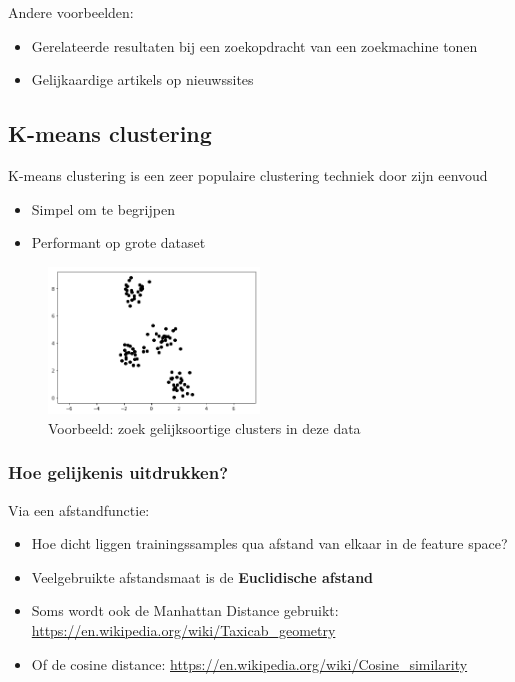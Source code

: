 \documentclass{article}
\begin{document}
Andere voorbeelden:

\begin{itemize}
    \item Gerelateerde resultaten bij een zoekopdracht van een zoekmachine tonen
    \item Gelijkaardige artikels op nieuwssites
\end{itemize}

\subsection{K-means clustering}

K-means clustering is een zeer populaire clustering techniek door zijn eenvoud

\begin{itemize}
    \item Simpel om te begrijpen
    \item Performant op grote dataset
\end{itemize}

\begin{figure}[H]
    \centering
    \includegraphics[width=0.5\textwidth]{k-means-1.png}
    \caption{Voorbeeld: zoek gelijksoortige clusters in deze data}
\end{figure}

\subsubsection{Hoe gelijkenis uitdrukken?}

Via een afstandfunctie:

\begin{itemize}
    \item Hoe dicht liggen trainingssamples qua afstand van elkaar in de feature space?
    \item Veelgebruikte afstandsmaat is de \textbf{Euclidische afstand}
    \item Soms wordt ook de Manhattan Distance gebruikt: \url{https://en.wikipedia.org/wiki/Taxicab_geometry}
    \item Of de cosine distance: \url{https://en.wikipedia.org/wiki/Cosine_similarity}
\end{itemize}
\end{document}
